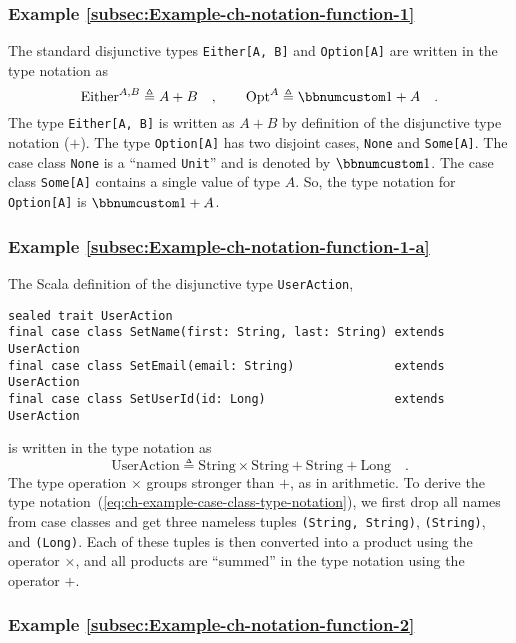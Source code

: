 \subsubsection{Example \label{subsec:Example-ch-notation-function-1}\ref{subsec:Example-ch-notation-function-1}}

The standard disjunctive types \lstinline!Either[A, B]! and \lstinline!Option[A]!
are written in the type notation as
\[
\text{Either}^{A,B}\triangleq A+B\quad,\quad\quad\text{Opt}^{A}\triangleq\bbnum 1+A\quad.
\]
The type \lstinline!Either[A, B]! is written as $A+B$ by definition
of the disjunctive type notation ($+$). The type \lstinline!Option[A]!
has two disjoint cases, \lstinline!None! and \lstinline!Some[A]!.
The case class \lstinline!None! is a \textsf{``}named
\lstinline!Unit!\textsf{''} and is denoted by $\bbnum 1$. The case class
\lstinline!Some[A]! contains a single value of type $A$. So, the
type notation for \lstinline!Option[A]! is $\bbnum 1+A$.

\subsubsection{Example \label{subsec:Example-ch-notation-function-1-a}\ref{subsec:Example-ch-notation-function-1-a}}

The Scala definition of the disjunctive type \lstinline!UserAction!,
\begin{lstlisting}
sealed trait UserAction
final case class SetName(first: String, last: String) extends UserAction
final case class SetEmail(email: String)              extends UserAction
final case class SetUserId(id: Long)                  extends UserAction
\end{lstlisting}
is written in the type notation as
\begin{equation}
\text{UserAction}\triangleq\text{String}\times\text{String}+\text{String}+\text{Long}\quad.\label{eq:ch-example-case-class-type-notation}
\end{equation}
The type operation $\times$ groups stronger than $+$, as in arithmetic.
To derive the type notation~(\ref{eq:ch-example-case-class-type-notation}),
we first drop all names from case classes and get three nameless tuples
\lstinline!(String, String)!, \lstinline!(String)!, and \lstinline!(Long)!.
Each of these tuples is then converted into a product using the operator
$\times$, and all products are \textsf{``}summed\textsf{''} in the type notation
using the operator $+$.

\subsubsection{Example \label{subsec:Example-ch-notation-function-2}\ref{subsec:Example-ch-notation-function-2}}

